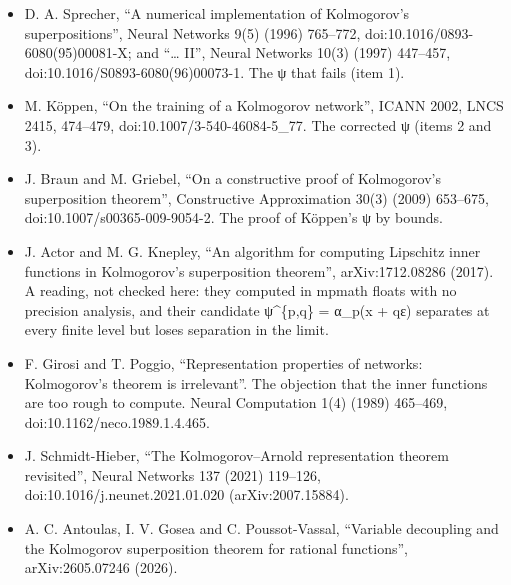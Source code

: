 \begin{itemize}
\item D. A. Sprecher, “A numerical implementation of Kolmogorov's superpositions”, Neural Networks 9(5) (1996) 765–772, doi:10.1016/0893-6080(95)00081-X; and “… II”, Neural Networks 10(3) (1997) 447–457, doi:10.1016/S0893-6080(96)00073-1. The ψ that fails (item 1).
\item M. Köppen, “On the training of a Kolmogorov network”, ICANN 2002, LNCS 2415, 474–479, doi:10.1007/3-540-46084-5\_\allowbreak{}77. The corrected ψ (items 2 and 3).
\item J. Braun and M. Griebel, “On a constructive proof of Kolmogorov's superposition theorem”, Constructive Approximation 30(3) (2009) 653–675, doi:10.1007/s00365-009-9054-2. The proof of Köppen's ψ by bounds.
\item J. Actor and M. G. Knepley, “An algorithm for computing Lipschitz inner functions in Kolmogorov's superposition theorem”, arXiv:1712.08286 (2017). A reading, not checked here: they computed in mpmath floats with no precision analysis, and their candidate ψ\textasciicircum{}\{p,q\} = α\_\allowbreak{}p(x + qε) separates at every finite level but loses separation in the limit.
\item F. Girosi and T. Poggio, “Representation properties of networks: Kolmogorov's theorem is irrelevant”. The objection that the inner functions are too rough to compute. Neural Computation 1(4) (1989) 465–469, doi:10.1162/neco.1989.1.4.465.
\item J. Schmidt-Hieber, “The Kolmogorov–Arnold representation theorem revisited”, Neural Networks 137 (2021) 119–126, doi:10.1016/j.neunet.2021.01.020 (arXiv:2007.15884).
\item A. C. Antoulas, I. V. Gosea and C. Poussot-Vassal, “Variable decoupling and the Kolmogorov superposition theorem for rational functions”, arXiv:2605.07246 (2026).
\end{itemize}

